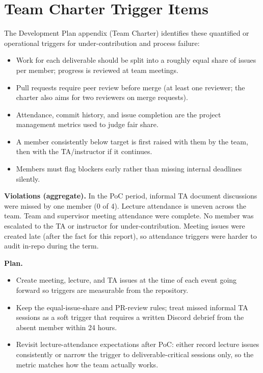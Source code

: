 \documentclass{article}
\begin{document}
\section{Team Charter Trigger Items}

The Development Plan appendix (Team Charter) identifies these quantified or
operational triggers for under-contribution and process failure:

\begin{itemize}
  \item Work for each deliverable should be split into a roughly equal share of
    issues per member; progress is reviewed at team meetings.
  \item Pull requests require peer review before merge (at least one reviewer;
    the charter also aims for two reviewers on merge requests).
  \item Attendance, commit history, and issue completion are the project
    management metrics used to judge fair share.
  \item A member consistently below target is first raised with them by the
    team, then with the TA/instructor if it continues.
  \item Members must flag blockers early rather than missing internal deadlines
    silently.
\end{itemize}

\noindent\textbf{Violations (aggregate).}
In the PoC period, informal TA document discussions were missed by one member
(0 of 4). Lecture attendance is uneven across the team. Team and supervisor
meeting attendance were complete. No member was escalated to the TA or
instructor for under-contribution. Meeting issues were created late (after the
fact for this report), so attendance triggers were harder to audit in-repo
during the term.

\noindent\textbf{Plan.}
\begin{itemize}
  \item Create meeting, lecture, and TA issues at the time of each event going
    forward so triggers are measurable from the repository.
  \item Keep the equal-issue-share and PR-review rules; treat missed informal
    TA sessions as a soft trigger that requires a written Discord debrief from
    the absent member within 24 hours.
  \item Revisit lecture-attendance expectations after PoC: either record
    lecture issues consistently or narrow the trigger to deliverable-critical
    sessions only, so the metric matches how the team actually works.
\end{itemize}
\end{document}
